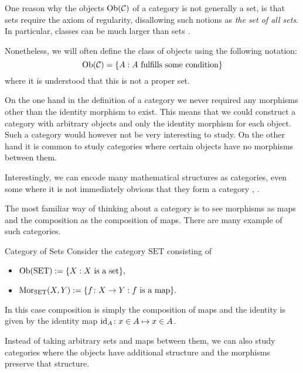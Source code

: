 One reason why the objects $\mathrm {Ob}(\mathcal{C})$ of a category is not generally a set, is that sets require the axiom of regularity, 
disallowing such notions as \emph{the set of all sets}. In particular, classes can be much larger than sets \cite[p.~1]{Roman2017}.

Nonetheless, we will often define the class of objects using the following notation:
$$
\mathrm {Ob}(\mathcal{C}) = \{A: \text{$A$ fulfills some condition}\}
$$
where it is understood that this is not a proper set.


On the one hand in the definition of a category we never required any morphisms other than the identity morphism to exist.
This means that we could construct a category with arbitrary objects and only the identity morphism for each object. 
Such a category would however not be very interesting to study.
On the other hand it is common to study categories where certain objects have no morphisms between them.

Interestingly, we can encode many mathematical structures as categories, even some where it is not immediately obvious that they form a category \cite[Chap.~1~Ex.~1-7]{Roman2017}, \cite[Sec.~1.1]{Leinster2014-dc}.

The most familiar way of thinking about a category is to see morphisms as maps and the composition as the composition of maps. There are many example of such categories.

\begin{example}{Category of Sets}{}
Consider the category $\mathrm{SET}$ consisting of
\begin{itemize}
    \item $\mathrm {Ob}(\mathrm{SET}) := \{X : \text{$X$ is a set}\},$
    \item $\mathrm {Mor}_{\mathrm{SET}}(X,Y) := \{f\colon X \to Y: \text{$f$ is a map}\}.$
\end{itemize}
In this case composition is simply the composition of maps and the identity is given by the identity map $\mathrm{id}_A\colon x \in A \mapsto x \in A$.
\end{example}

Instead of taking arbitrary sets and maps between them, we can also study categories where the objects have additional structure and the morphisms preserve that structure.

